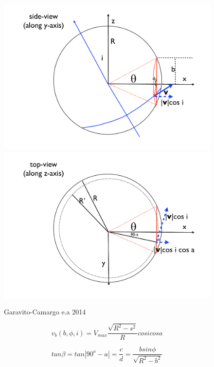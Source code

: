 \documentclass{beamer}
\begin{document}
\begin{frame}
\begin{figure}
\includegraphics[scale=0.2]{Figures/fig11a.pdf}
\includegraphics[scale=0.2]{Figures/fig11b.pdf}
\caption*{Garavito-Camargo e.a 2014}
\end{figure}

\begin{equation}
v_b(b, \phi, i) =   V_{max}\dfrac{\sqrt{R^2 - s^2}}{R}cosi cosa
\end{equation}

\begin{equation}
tan \beta = tan|90^o-a| = \dfrac{c}{d} = \dfrac{b sin \phi}{\sqrt{R^2 - b^2}}
\end{equation}
\end{frame}
\end{document}
